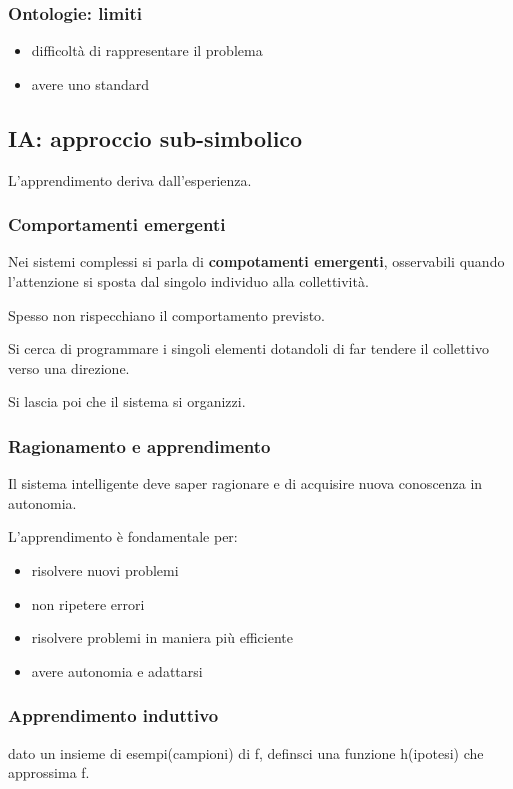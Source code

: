 \subsubsection{Ontologie: limiti}
\begin{itemize}
    \item difficoltà di rappresentare il problema
    \item avere uno standard
\end{itemize}

\subsection{IA: approccio sub-simbolico}
L'apprendimento deriva dall'esperienza.

\subsubsection{Comportamenti emergenti}
Nei sistemi complessi si parla di \textbf{compotamenti emergenti}, osservabili quando
l'attenzione si sposta dal singolo individuo alla collettività.

Spesso non rispecchiano il comportamento previsto.

Si cerca di programmare i singoli elementi dotandoli di far tendere il collettivo verso una direzione.

Si lascia poi che il sistema si organizzi.

\subsubsection{Ragionamento e apprendimento}
Il sistema intelligente deve saper ragionare e di acquisire nuova conoscenza in autonomia.

L'apprendimento è fondamentale per:
\begin{itemize}
    \item risolvere nuovi problemi
    \item non ripetere errori
    \item risolvere problemi in maniera più efficiente
    \item avere autonomia e adattarsi
\end{itemize}

\subsubsection{Apprendimento induttivo}
dato un insieme di esempi(campioni) di f, definsci una funzione h(ipotesi) che approssima f.

